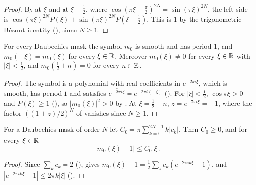\begin{proof}
\leanok
{}
By  at $\xi$ and at $\xi + \frac12$, where
$\cos(\pi\xi + \frac{\pi}{2})^{2N} = \sin(\pi\xi)^{2N}$, the left side is
$\cos(\pi\xi)^{2N} P(\xi) + \sin(\pi\xi)^{2N} P(\xi + \frac12)$. This is $1$ by the
trigonometric B\'ezout identity (), since $N \geq 1$.
\end{proof}

\begin{lemma}
\label{lem:daub-symbol-props}
\leanok
{}
For every Daubechies mask the symbol $m_0$ is smooth and has period $1$, and
$m_0(-\xi) = \overline{m_0(\xi)}$ for every $\xi \in \mathbb{R}$. Moreover $m_0(\xi) \neq 0$ for every
$\xi \in \mathbb{R}$ with $|\xi| < \frac12$, and $m_0(\frac12 + n) = 0$ for every $n \in \mathbb{Z}$.
\end{lemma}

\begin{proof}
\leanok
{}
The symbol is a polynomial with real coefficients in $e^{-2\pi i \xi}$, which is smooth, has
period $1$ and satisfies $\overline{e^{-2\pi i \xi}} = e^{-2\pi i (-\xi)}$ ().
For $|\xi| < \frac12$, $\cos \pi\xi > 0$ and $P(\xi) \geq 1$ (), so
$|m_0(\xi)|^2 > 0$ by . At $\xi = \frac12 + n$,
$z = e^{-2\pi i \xi} = -1$, where the factor $((1 + z)/2)^N$ of 
vanishes since $N \geq 1$.
\end{proof}

\begin{lemma}
\label{lem:daub-symbol-lipschitz}
\leanok
{}
For a Daubechies mask of order $N$ let $C_0 = \pi \sum_{k=0}^{2N-1} k |c_k|$. Then $C_0 \geq 0$,
and for every $\xi \in \mathbb{R}$
\[
  |m_0(\xi) - 1| \leq C_0 |\xi| .
\]
\end{lemma}

\begin{proof}
\leanok
{}
Since $\sum_k c_k = 2$ (),  gives
$m_0(\xi) - 1 = \frac12 \sum_k c_k (e^{-2\pi i k \xi} - 1)$, and
$|e^{-2\pi i k \xi} - 1| \leq 2\pi k |\xi|$ ().
\end{proof}

